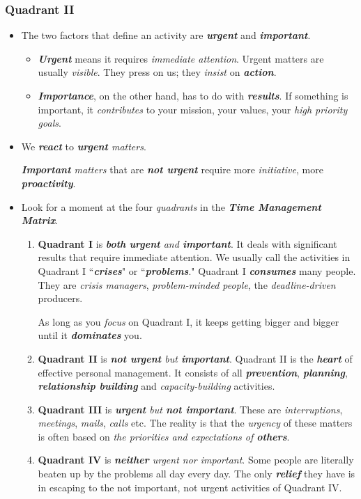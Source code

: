 \documentclass[11pt]{article}
\begin{document}
\subsubsection{Quadrant II}
\begin{itemize}
\item The two factors that define an activity are \emph{\textbf{urgent}} and \emph{\textbf{important}}.
\begin{itemize}
\item  \emph{\textbf{Urgent}} means it requires \emph{immediate attention}.  Urgent matters are usually \emph{visible}. They press on us; they \emph{insist} on \emph{\textbf{action}}. 
\item \emph{\textbf{Importance}}, on the other hand, has to do with \emph{\textbf{results}}. If something is important, it \emph{contributes} to your mission, your values, your \emph{high priority goals}.
\end{itemize}

\item We \emph{\textbf{react}} to \emph{\textbf{urgent} matters}.

\emph{\textbf{Important} matters} that are \emph{\textbf{not urgent}} require more \emph{initiative}, more \emph{\textbf{proactivity}}. 

\item Look for a moment at the four \emph{quadrants} in the \emph{\textbf{Time Management Matrix}}.
\begin{enumerate}
\item \textbf{Quadrant I} is \emph{\textbf{both} \textbf{urgent} and \textbf{important}}. It deals with significant results that require immediate attention. We usually call the activities in Quadrant I ``\textit{\textbf{crises}}" or ``\emph{\textbf{problems}}." Quadrant I \emph{\textbf{consumes}} many people. They are \emph{crisis managers}, \emph{problem-minded people}, the \emph{deadline-driven} producers.

As long as you \emph{focus} on Quadrant I, it keeps getting bigger and bigger until it \emph{\textbf{dominates}} you.  

\item \textbf{Quadrant II} is \emph{\textbf{not urgent} but \textbf{important}}. Quadrant II is the \emph{\textbf{heart}} of effective personal management. It consists of all \emph{\textbf{prevention}}, \emph{\textbf{planning}}, \emph{\textbf{relationship building}} and \emph{capacity-building}  activities.

\item \textbf{Quadrant III} is \emph{\textbf{urgent} but \textbf{not important}}. These are \emph{interruptions}, \emph{meetings}, \emph{mails}, \emph{calls} etc. The reality is that the \emph{urgency} of these matters is often based on \emph{the priorities and expectations of \textbf{others}}.
\item \textbf{Quadrant IV} is \emph{\textbf{neither} urgent nor important}. Some people are literally beaten up by the problems all day every day. The only \emph{\textbf{relief}} they have is in escaping to the not important, not urgent activities of Quadrant IV. 
\end{enumerate}


\end{itemize}
\end{document}
